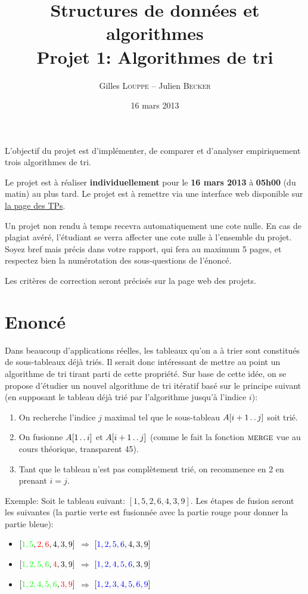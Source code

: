 \documentclass[a4paper,10pt]{article}
\title{
    \textbf{Structures de données et algorithmes}\\
    Projet 1: Algorithmes de tri
}
\author{Gilles \textsc{Louppe} -- Julien \textsc{Becker}}
\date{16 mars 2013}
\begin{document}
\maketitle

L'objectif du projet est d'implémenter, de comparer et d'analyser empiriquement
trois algorithmes de tri.

Le projet est à réaliser {\bf individuellement} pour le {\bf 16 mars 2013} à
{\bf 05h00} (du matin) au plus tard. Le projet est à remettre via une interface
web disponible sur \href{http://www.montefiore.ulg.ac.be/~glouppe/2012-2013/students.info0902.php}{la page des TPs}.

Un projet non rendu à temps recevra automatiquement une cote nulle. En
cas de plagiat avéré, l'étudiant se verra affecter une cote nulle à
l'ensemble du projet. Soyez bref mais précis dans votre rapport, qui
fera au maximum 5 pages, et respectez bien la numérotation des
sous-questions de l'énoncé.

Les critères de correction seront précisés sur la page web des
projets.

\section{Enoncé}

Dans beaucoup d'applications réelles, les tableaux qu'on a à trier
sont constitués de sous-tableaux déjà triés. Il serait donc
intéressant de mettre au point un algorithme de tri tirant parti de
cette propriété. Sur base de cette idée, on se propose d'étudier un
nouvel algorithme de tri itératif basé sur le principe suivant (en
supposant le tableau déjà trié par l'algorithme jusqu'à l'indice $i$):
\begin{enumerate}
\item On recherche l'indice $j$ maximal tel que le sous-tableau $A[i+1\mathinner{\ldotp\ldotp} j]$ soit trié.
\item On fusionne $A[1\mathinner{\ldotp\ldotp} i]$ et $A[i+1 \mathinner{\ldotp\ldotp} j]$ (comme le
  fait la fonction $\textnormal{\scshape merge}$ vue au cours théorique, transparent
  45).
\item Tant que le tableau n'est pas complètement trié, on recommence
  en 2 en prenant $i=j$.
\end{enumerate}

\bigskip

Exemple: Soit le tableau suivant: $[1,5,2,6,4,3,9]$. Les étapes de
fusion seront les suivantes (la partie verte est fusionnée avec la
partie rouge pour donner la partie bleue):
\begin{itemize}
\item $[{\color{green} 1,5},{\color{red} 2,6},4,3,9]$ $\Rightarrow$ $[{\color{blue} 1,2,5,6},4,3,9]$
\item $[{\color{green} 1,2,5,6},{\color{red}4},3,9]$ $\Rightarrow$ $[{\color{blue} 1,2,4,5,6},3,9]$
\item $[{\color{green} 1,2,4,5,6},{\color{red} 3,9}]$ $\Rightarrow$ $[{\color{blue} 1,2,3,4,5,6,9}]$
\end{itemize}
\end{document}
